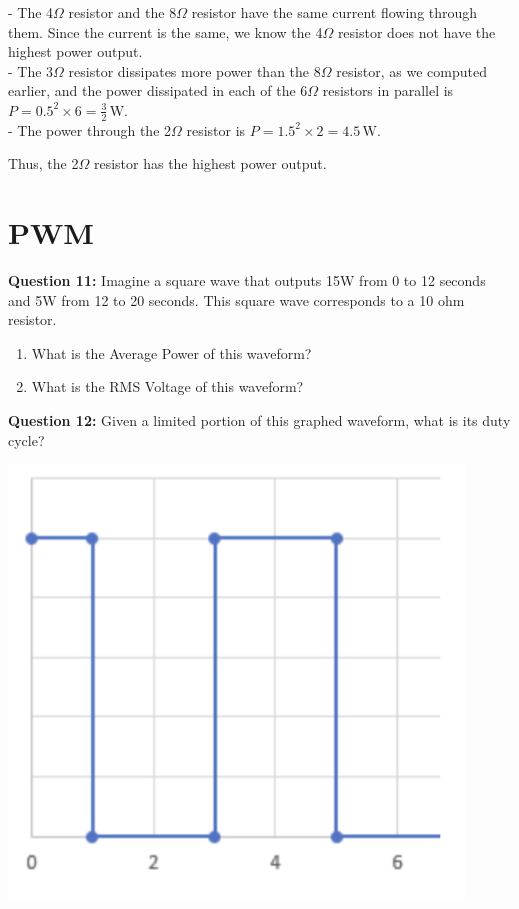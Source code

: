 \documentclass{article}
\begin{document}
\begin{enumerate}
- The 4\(\Omega\) resistor and the 8\(\Omega\) resistor have the same current flowing through them. Since the current is the same, we know the 4\(\Omega\) resistor does not have the highest power output. 
\\
- The 3\(\Omega\) resistor dissipates more power than the 8\(\Omega\) resistor, as we computed earlier, and the power dissipated in each of the 6\(\Omega\) resistors in parallel is \( P = 0.5^2 \times 6 = \frac{3}{2} \, \text{W} \).
\\
- The power through the 2\(\Omega\) resistor is \( P = 1.5^2 \times 2 = 4.5 \, \text{W} \).

Thus, the 2\(\Omega\) resistor has the highest power output.
\end{enumerate}

\section*{PWM}
\textbf{Question 11:} Imagine a square wave that outputs 15W from 0 to 12 seconds and 5W from 12 to 20 seconds. This square wave corresponds to a 10 ohm resistor.
\begin{enumerate}
    \item What is the Average Power of this waveform?
    \item What is the RMS Voltage of this waveform?
\end{enumerate}
\textbf{Question 12:} Given a limited portion of this graphed waveform, what is its duty cycle?

\begin{center}

        \includegraphics[width=0.75\linewidth]{figures/8.png}
\end{center}
\end{document}
